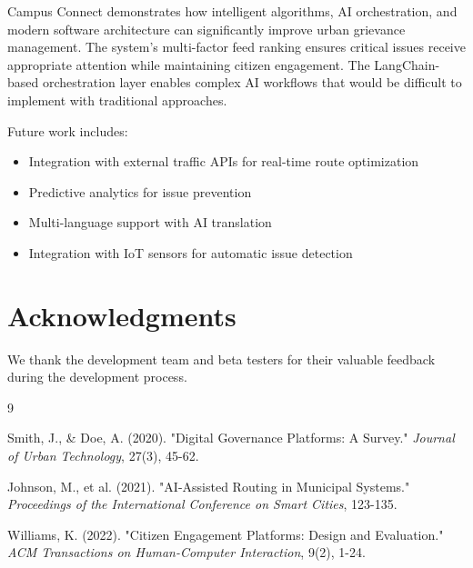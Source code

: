 \documentclass[12pt,a4paper]{article}
\begin{document}
Campus Connect demonstrates how intelligent algorithms, AI orchestration, and modern software architecture can significantly improve urban grievance management. The system's multi-factor feed ranking ensures critical issues receive appropriate attention while maintaining citizen engagement. The LangChain-based orchestration layer enables complex AI workflows that would be difficult to implement with traditional approaches.

Future work includes:
\begin{itemize}
    \item Integration with external traffic APIs for real-time route optimization
    \item Predictive analytics for issue prevention
    \item Multi-language support with AI translation
    \item Integration with IoT sensors for automatic issue detection
\end{itemize}

\section{Acknowledgments}

We thank the development team and beta testers for their valuable feedback during the development process.

\begin{thebibliography}{9}

Smith, J., \& Doe, A. (2020). "Digital Governance Platforms: A Survey." \textit{Journal of Urban Technology}, 27(3), 45-62.

Johnson, M., et al. (2021). "AI-Assisted Routing in Municipal Systems." \textit{Proceedings of the International Conference on Smart Cities}, 123-135.

Williams, K. (2022). "Citizen Engagement Platforms: Design and Evaluation." \textit{ACM Transactions on Human-Computer Interaction}, 9(2), 1-24.

\end{thebibliography}
\end{document}
